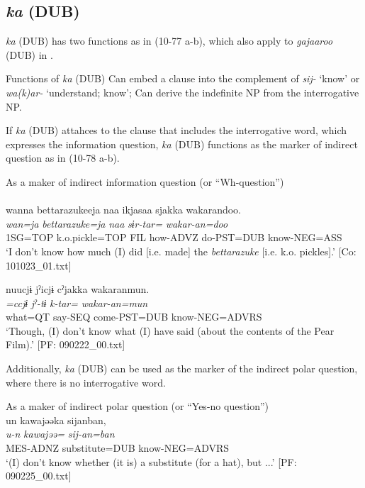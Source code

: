 \subsection{\textit{ka} (DUB)}\label{sec:10.4.2}

\textit{ka} (DUB) has two functions as in (10-77 a-b), which also apply to \textit{gajaaroo} (DUB) in .

\ea\label{ex:10.77} Functions of \textit{ka} (DUB)
 \ea Can embed a clause into the complement of \textit{sij-} ‘know’ or \textit{wa(k)ar-} ‘understand; know’;
 \ex Can derive the indefinite NP from the interrogative NP.
 \z
\z

If \textit{ka} (DUB) attahces to the clause that includes the interrogative word, which expresses the information question, \textit{ka} (DUB) functions as the marker of indirect question as in (10-78 a-b).

\ea\label{ex:10.78}   As a maker of indirect information question (or “Wh-question”)\\
  \ea\relax  [= (5-38 a)]\\
      \glll    wanna  {\textbar}bettarazukee{\textbar}ja  naa  ikjasaa  sjakka  wakarandoo.\\
      \textit{wan=ja}  \textit{bettarazuke=ja}  \textit{naa}  \textit{}  \textit{sɨr-tar=}  \textit{wakar-an=doo}\\
      1SG=TOP  k.o.pickle=TOP  FIL  how-ADVZ  do-PST=DUB  know-NEG=ASS\\
      \glt       ‘I don’t know how much (I) did [i.e. made] the \textit{bettarazuke} [i.e. k.o. pickles].’ [Co: 101023\_01.txt]

  \ex %
      \glll    nuucjɨ  jˀicjɨ  cˀjakka  wakaranmun.\\
      \textit{=ccjɨ}  \textit{jˀ-tɨ}  \textit{k-tar=}  \textit{wakar-an=mun}\\
      what=QT  say-SEQ  come-PST=DUB  know-NEG=ADVRS\\
      \glt       ‘Though, (I) don’t know what (I) have said (about the contents of the Pear Film).’ [PF: 090222\_00.txt]
    \z
\z

Additionally, \textit{ka} (DUB) can be used as the marker of the indirect polar question, where there is no interrogative word.

\ea\label{ex:10.79}   As a maker of indirect polar question (or “Yes-no question”)\\
  \ea  %
      \glll    un  kawajəəka  sijanban,\\
      \textit{u-n}  \textit{kawajəə=}  \textit{sij-an=ban}\\
      MES-ADNZ  substitute=DUB  know-NEG=ADVRS\\
      \glt       ‘(I) don’t know whether (it is) a substitute (for a hat), but ...’ [PF: 090225\_00.txt]

